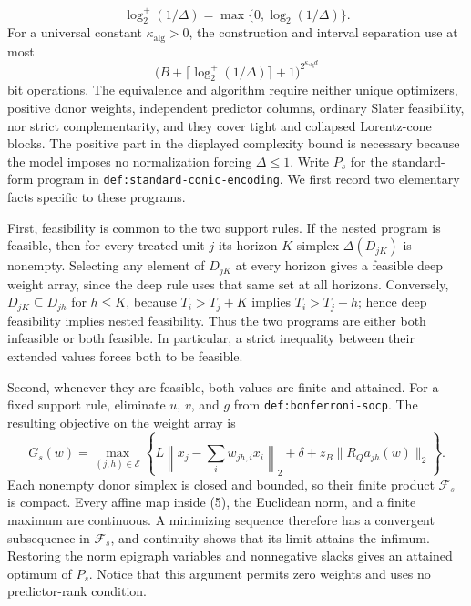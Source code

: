 \[
 \log_2^+(1/\Delta)=\max\{0,\log_2(1/\Delta)\}.
\]
For a universal constant \(\kappa_{\mathrm{alg}}>0\), the construction and
interval separation use
at most
\[
 \bigl(B+\lceil\log_2^+(1/\Delta)\rceil+1\bigr)^{2^{\kappa_{\mathrm{alg}}d}}
\]
bit operations.  The equivalence and algorithm require neither unique
optimizers, positive donor weights, independent predictor columns, ordinary
Slater feasibility, nor strict complementarity, and they cover tight and
collapsed Lorentz-cone blocks.  The positive part in the displayed complexity
bound is necessary because the model imposes no normalization forcing
\(\Delta\le1\).
Write \(P_s\) for the standard-form program in
\texttt{def:standard-conic-encoding}.  We first record two elementary facts
specific to these programs.

First, feasibility is common to the two support rules.  If the nested program
is feasible, then for every treated unit \(j\) its horizon-\(K\) simplex
\(\Delta(D_{jK})\) is nonempty.  Selecting any element of \(D_{jK}\) at every
horizon gives a feasible deep weight array, since the deep rule uses that same
set at all horizons.  Conversely, \(D_{jK}\subseteq D_{jh}\) for
\(h\le K\), because
\(T_i>T_j+K\) implies \(T_i>T_j+h\); hence deep feasibility implies nested
feasibility.  Thus the two programs are either both infeasible or both
feasible.  In particular, a strict inequality between their extended values
forces both to be feasible.

Second, whenever they are feasible, both values are finite and attained.  For
a fixed support rule, eliminate \(u\), \(v\), and \(g\) from
\texttt{def:bonferroni-socp}.  The resulting objective on the weight array is
\[
 G_s(w)=\max_{(j,h)\in\mathcal E}
 \left\{
 L\left\|x_j-\sum_iw_{jh,i}x_i\right\|_2
 +\delta+z_B\|R_Qa_{jh}(w)\|_2
 \right\}. \tag{5}
\]
Each nonempty donor simplex is closed and bounded, so their finite product
\(\mathcal F_s\) is compact.  Every affine map inside (5), the Euclidean norm,
and a finite maximum are continuous.  A minimizing sequence therefore has a
convergent subsequence in \(\mathcal F_s\), and continuity shows that its limit
attains the infimum.  Restoring the norm epigraph variables and nonnegative
slacks gives an attained optimum of \(P_s\).  Notice that this argument permits
zero weights and uses no predictor-rank condition.

